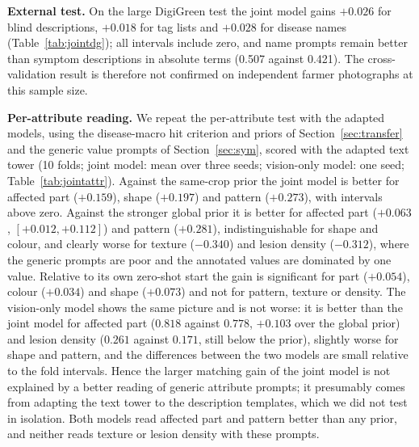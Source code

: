 \documentclass[11pt]{article}
\begin{document}
\textbf{External test.} On the large DigiGreen test the joint model gains $+0.026$ for blind descriptions, $+0.018$ for tag lists and $+0.028$ for disease names (Table~\ref{tab:jointdg}); all intervals include zero, and name prompts remain better than symptom descriptions in absolute terms (0.507 against 0.421). The cross-validation result is therefore not confirmed on independent farmer photographs at this sample size.

\textbf{Per-attribute reading.} We repeat the per-attribute test with the adapted models, using the disease-macro hit criterion and priors of Section~\ref{sec:transfer} and the generic value prompts of Section~\ref{sec:sym}, scored with the adapted text tower (10 folds; joint model: mean over three seeds; vision-only model: one seed; Table~\ref{tab:jointattr}). Against the same-crop prior the joint model is better for affected part ($+0.159$), shape ($+0.197$) and pattern ($+0.273$), with intervals above zero. Against the stronger global prior it is better for affected part ($+0.063$, $[+0.012, +0.112]$) and pattern ($+0.281$), indistinguishable for shape and colour, and clearly worse for texture ($-0.340$) and lesion density ($-0.312$), where the generic prompts are poor and the annotated values are dominated by one value. Relative to its own zero-shot start the gain is significant for part ($+0.054$), colour ($+0.034$) and shape ($+0.073$) and not for pattern, texture or density. The vision-only model shows the same picture and is not worse: it is better than the joint model for affected part ($0.818$ against $0.778$, $+0.103$ over the global prior) and lesion density ($0.261$ against $0.171$, still below the prior), slightly worse for shape and pattern, and the differences between the two models are small relative to the fold intervals. Hence the larger matching gain of the joint model is not explained by a better reading of generic attribute prompts; it presumably comes from adapting the text tower to the description templates, which we did not test in isolation. Both models read affected part and pattern better than any prior, and neither reads texture or lesion density with these prompts.
\begin{table}[t]\centering\small
\resizebox{\linewidth}{!}{}
\caption{Per-attribute probe of the vision-only (seed 0) and joint (three-seed mean) models on held-out diseases (10-fold CV). Fraction of test images whose top-scoring attribute value is among their group's annotated values, macro over diseases; the last two columns are the fold-bootstrap differences to the global prior.}\label{tab:jointattr}
\end{table}
\end{document}
